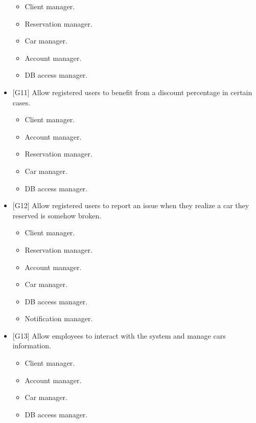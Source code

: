 \begin{itemize}
\begin{itemize}
		\item Client manager.
		\item Reservation manager.
		\item Car manager.
		\item Account manager.
		\item DB access manager.
	\end{itemize} 
	\item {[G11]} Allow registered users to benefit from a discount percentage in certain cases.
	\begin{itemize}
		\item Client manager.
		\item Account manager.
		\item Reservation manager.
		\item Car manager.
		\item DB access manager.
	\end{itemize} 
	\item {[G12]} Allow registered users to report an issue when they realize a car they reserved is somehow broken.
	\begin{itemize}
		\item Client manager.
		\item Reservation manager.
		\item Account manager.
		\item Car manager.
		\item DB access manager.
		\item Notification manager.
	\end{itemize} 
	\item {[G13]} Allow employees to interact with the system and manage cars information.
	\begin{itemize}
		\item Client manager.
		\item Account manager.
		\item Car manager.
		\item DB access manager.
	\end{itemize} 
\end{itemize}